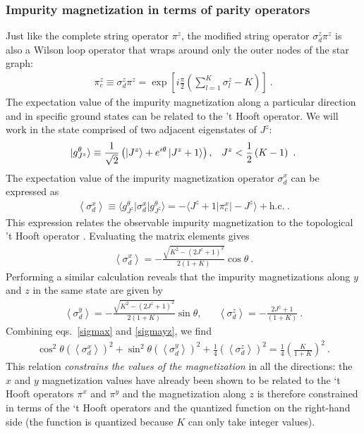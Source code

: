 \documentclass[12pt]{iopart}
\begin{document}
\subsubsection{Impurity magnetization in terms of parity operators}
Just like the complete string operator \(\pi^z\), the modified string operator \(\sigma_d^z \pi^z\) is also a Wilson loop operator that wraps around only the outer nodes of the star graph:
\begin{eqnarray}
	\pi^z_c \equiv \sigma_d^z \pi^z = \exp\left[i \frac{\pi}{2} \left(\sum_{l=1}^K \sigma^z_l - K\right)\right] ~.
\end{eqnarray}
The expectation value of the impurity magnetization along a particular direction and in specific ground states can be related to the 't Hooft operator. We will work in the state comprised of two adjacent eigenstates of \(J^z\):
\begin{eqnarray}
	\ket{g^\theta_{J^z}} \equiv \frac{1}{\sqrt 2}\left( \ket{J^z} + e^{i\theta}\ket{J^z+1}\right), && J^z < \frac{1}{2}\left( K-1 \right)~.
\end{eqnarray}
The expectation value of the impurity magnetization operator \(\sigma_d^x\) can be expressed as
\begin{eqnarray}
	\left<\sigma_d^x\right> \equiv \langle g^\theta_{J^z} \vert \sigma_d^x \vert g^\theta_{J^z}\rangle = - \langle J^z + 1 \vert \pi^x_c \vert -J^z \rangle + \text{h.c.}~.
\end{eqnarray}
This expression relates the observable impurity magnetization to the topological 't Hooft operator \cite{Maric2020}. Evaluating the matrix elements gives
\begin{eqnarray}
	\label{sigmax}
	\left<\sigma_d^x\right> = - \frac{\sqrt{K^2 - (2J^z + 1)^2}}{2(1+K)}\cos \theta~.
\end{eqnarray}
Performing a similar calculation reveals that the impurity magnetizations along \(y\) and \(z\) in the same state are given by
\begin{eqnarray}
	\label{sigmayz}
	\left<\sigma_d^y\right> = - \frac{\sqrt{K^2 - (2J^z + 1)^2}}{2(1+K)}\sin \theta, &&\left<\sigma_d^z\right> = - \frac{2J^z + 1}{(1+K)}~.
\end{eqnarray}
Combining eqs.~\ref{sigmax} and \ref{sigmayz}, we find
\begin{eqnarray}
	\cos^2\theta\left(\left<\sigma^x_d\right>\right)^2 + \sin^2\theta\left(\left<\sigma^y_d\right>\right)^2 + \frac{1}{4}\left(\left<\sigma^z_d\right>\right)^2 = \frac{1}{4}\left(\frac{K}{1+K}\right)^2~.
\end{eqnarray}
This relation \textit{constrains the values of the magnetization} in all the directions: the \(x\) and \(y\) magnetization values have already been shown to be related to the `t Hooft operators \(\pi^x\) and \(\pi^y\) and the magnetization along \(z\) is therefore constrained in terms of the `t Hooft operators and the quantized function on the right-hand side (the function is quantized because \(K\) can only take integer values).
\end{document}
